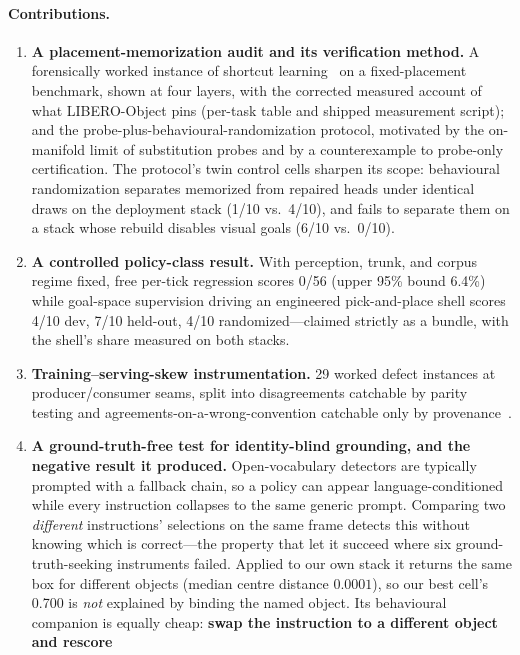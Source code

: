 \documentclass[10pt,twocolumn,letterpaper]{article}
\begin{document}
\paragraph{Contributions.}
\begin{enumerate}\itemsep2pt
\item \textbf{A placement-memorization audit and its verification method.}
A forensically worked instance of shortcut
learning~\citep{geirhos2020shortcut,dehaan2019causal} on a fixed-placement
benchmark, shown at four layers, with the corrected measured account of what
LIBERO-Object pins (per-task table and shipped measurement script); and the
probe-plus-behavioural-randomization protocol, motivated by the on-manifold
limit of substitution probes and by a counterexample to probe-only
certification. The protocol's twin control cells sharpen its scope:
behavioural randomization separates memorized from repaired heads under
identical draws on the deployment stack (1/10 vs.\ 4/10), and fails to
separate them on a stack whose rebuild disables visual goals (6/10 vs.\ 0/10).
\item \textbf{A controlled policy-class result.} With perception, trunk, and
corpus regime fixed, free per-tick regression scores 0/56 (upper 95\% bound
6.4\%) while goal-space supervision driving an engineered pick-and-place shell
scores 4/10 dev, 7/10 held-out, 4/10 randomized---claimed strictly as a bundle,
with the shell's share measured on both stacks.
\item \textbf{Training--serving-skew instrumentation.} 29 worked defect
instances at producer/consumer seams, split into disagreements catchable by
parity testing and agreements-on-a-wrong-convention catchable only by
provenance~\citep{sculley2015debt,breck2017mltest}.
\item \textbf{A ground-truth-free test for identity-blind grounding, and the
negative result it produced.} Open-vocabulary detectors are typically prompted
with a fallback chain, so a policy can appear language-conditioned while every
instruction collapses to the same generic prompt. Comparing two \emph{different}
instructions' selections on the same frame detects this without knowing which
is correct---the property that let it succeed where six ground-truth-seeking
instruments failed. Applied to our own stack it returns the same box for
different objects (median centre distance $0.0001$), so our best cell's 0.700 is
\emph{not} explained by binding the named object. Its behavioural companion is
equally cheap: \textbf{swap the instruction to a different object and rescore
}
\end{enumerate}
\end{document}
